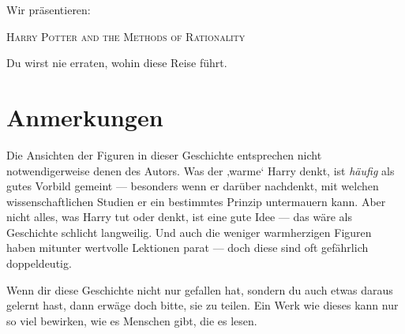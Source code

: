 \begin{center}
Wir präsentieren:

\textsc{Harry Potter and the Methods of Rationality}

Du wirst nie erraten, wohin diese Reise führt.
\end{center}

\section*{Anmerkungen}
Die Ansichten der Figuren in dieser Geschichte entsprechen nicht notwendigerweise denen des Autors. Was der ‚warme‘ Harry denkt, ist \emph{häufig} als gutes Vorbild gemeint — besonders wenn er darüber nachdenkt, mit welchen wissenschaftlichen Studien er ein bestimmtes Prinzip untermauern kann. Aber nicht alles, was Harry tut oder denkt, ist eine gute Idee — das wäre als Geschichte schlicht langweilig. Und auch die weniger warmherzigen Figuren haben mitunter wertvolle Lektionen parat — doch diese sind oft gefährlich doppeldeutig.


Wenn dir diese Geschichte nicht nur gefallen hat, sondern du auch etwas daraus gelernt hast, dann erwäge doch bitte, sie zu teilen. Ein Werk wie dieses kann nur so viel bewirken, wie es Menschen gibt, die es lesen.
